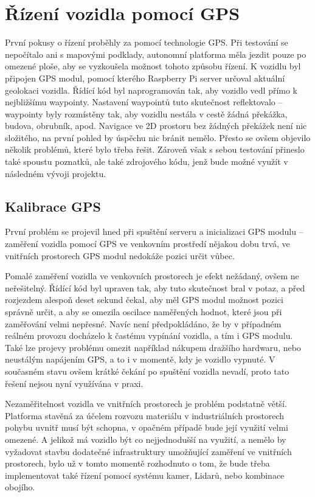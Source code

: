 \documentclass[czech, bachelor]{diploma}
\begin{document}
\section{Řízení vozidla pomocí GPS} \label{gps-failure}

První pokusy o řízení proběhly za pomocí technologie GPS. Při testování se nepočítalo ani s mapovými podklady, autonomní platforma
měla jezdit pouze po omezené ploše, aby se vyzkoušela možnost tohoto způsobu řízení. K vozidlu byl připojen GPS modul, pomocí
kterého Raspberry Pi server určoval aktuální geolokaci vozidla. Řídící kód byl naprogramován tak, aby vozidlo vedl přímo
k nejbližšímu waypointy. Nastavení waypointů tuto skutečnost reflektovalo -- waypointy byly rozmístěny tak, aby vozidlu nestála
v cestě žádná překážka, budova, obrubník, apod. Navigace ve 2D prostoru bez žádných překážek není nic složitého, na první pohled
by úspěchu nic bránit nemělo. Přesto se ovšem objevilo několik problémů, které bylo třeba řešit. Zároveň však s sebou testování
přineslo také spoustu poznatků, ale také zdrojového kódu, jenž bude možné využít v následném vývoji projektu.

\subsection{Kalibrace GPS}

První problém se projevil hned při spuštění serveru a inicializaci GPS modulu -- zaměření vozidla pomocí GPS ve venkovním
prostředí nějakou dobu trvá, ve vnitřních prostorech GPS modul nedokáže pozici určit vůbec.

Pomalé zaměření vozidla ve venkovních prostorech je efekt nežádaný, ovšem ne neřešitelný. Řídící kód byl upraven tak, aby tuto
skutečnost bral v potaz, a před rozjezdem alespoň deset sekund čekal, aby měl GPS modul možnost pozici správně určit, a aby se
omezila oscilace naměřených hodnot, které jsou při zaměřování velmi nepřesné. Navíc není předpokládáno, že by v případném reálném
provozu docházelo k častému vypínání vozidla, a tím i GPS modulu. Také lze projevy problému omezit například nákupem dražšího
hardwaru, nebo neustálým napájením GPS, a to i v momentě, kdy je vozidlo vypnuté. V současném stavu ovšem krátké čekání
po spuštění vozidla nevadí, proto tato řešení nejsou nyní využívána v praxi.

Nezaměřitelnost vozidla ve vnitřních prostorech je problém podstatně větší. Platforma stavěná za účelem rozvozu materiálu
v industriálních prostorech pohybu uvnitř musí být schopna, v opačném případě bude její využití velmi omezené. A jelikož má
vozidlo být co nejjednodušší na využití, a nemělo by vyžadovat stavbu dodatečné infrastruktury umožňující zaměření ve vnitřních
prostorech, bylo už v tomto momentě rozhodnuto o tom, že bude třeba implementovat také řízení pomocí systému kamer, Lidarů, nebo
kombinace obojího.
\end{document}
